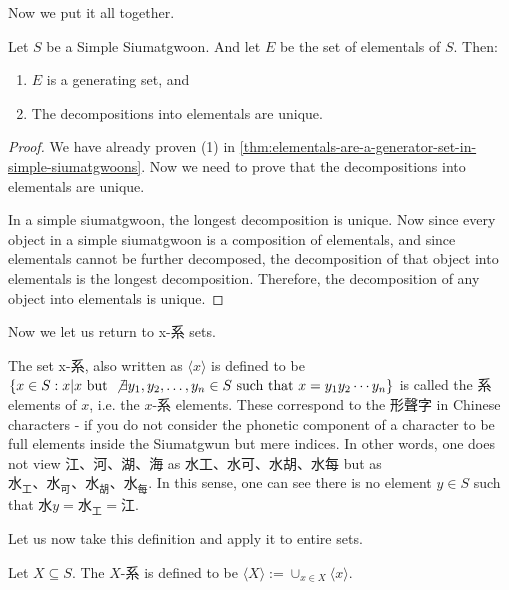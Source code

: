 Now we put it all together.
\begin{theorem}
    Let $S$ be a Simple Siumatgwoon. And let $E$ be the set of elementals of $S$. Then: 
    \begin{enumerate}
        \item $E$ is a generating set, and 
        \item The decompositions into elementals are unique.
    \end{enumerate}
\end{theorem}
\begin{proof}
    We have already proven (1) in \ref{thm:elementals-are-a-generator-set-in-simple-siumatgwoons}. Now we need to prove that the decompositions into elementals are unique.

    In a simple siumatgwoon, the longest decomposition is unique. Now since every object in a simple siumatgwoon is a composition of elementals, and since elementals cannot be further decomposed, the decomposition of that object into elementals is the longest decomposition. Therefore, the decomposition of any object into elementals is unique.
\end{proof}


Now we let us return to x-系 sets.

\begin{definition}\label{def:hai-elements}
The set x-系, also written as $\langle x \rangle$ is defined to be $\{ x\in S: x|x \text{ but } \not \exists y_1, y_2,\ldots, y_n \in S \text{ such that } x=y_1y_2\cdots y_n\}$ is called the 系 elements of $x$, i.e. the $x$-系 elements. These correspond to the 形聲字 in Chinese characters - if you do not consider the phonetic component of a character to be full elements inside the Siumatgwun but mere indices. In other words, one does not view 江、河、湖、海 as 水工、水可、水胡、水每 but as $\text{水}_\text{工}、\text{水}_\text{可}、\text{水}_\text{胡}、\text{水}_\text{每}$. In this sense, one can see there is no element $y \in S$ such that $\text{水}y=\text{水}_\text{工}=\text{江}$.
\end{definition}


Let us now take this definition and apply it to entire sets. 

\begin{definition}[X-系]\label{def:hais-of-sets}
    Let $X\subseteq S$. The $X$-系 is defined to be $\langle X \rangle := \cup_{x\in X} \langle x \rangle$.
\end{definition}


